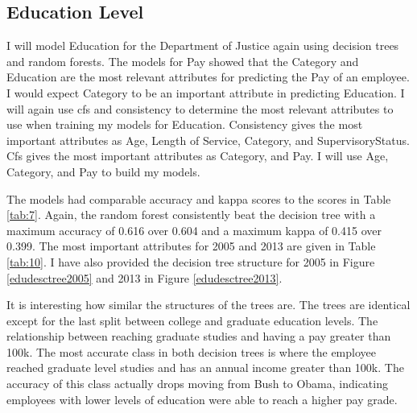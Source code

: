 \documentclass{article}
\begin{document}
    \subsection{Education Level}
    I will model Education for the Department of Justice again using decision trees and random forests. The models for Pay showed that the Category and Education are the most relevant attributes for predicting the Pay of an employee. I would expect Category to be an important attribute in predicting Education. I will again use cfs and consistency to determine the most relevant attributes to use when training my models for Education. Consistency gives the most important attributes as Age, Length of Service, Category, and SupervisoryStatus. Cfs gives the most important attributes as Category, and Pay. I will use Age, Category, and Pay to build my models.
    \par
    The models had comparable accuracy and kappa scores to the scores in Table \ref{tab:7}. Again, the random forest consistently beat the decision tree with a maximum accuracy of 0.616 over 0.604 and a maximum kappa of 0.415 over 0.399. The most important attributes for 2005 and 2013 are given in Table \ref{tab:10}. I have also provided the decision tree structure for 2005 in Figure \ref{edudesctree2005} and 2013 in Figure \ref{edudesctree2013}.
    \par
    It is interesting how similar the structures of the trees are. The trees are identical except for the last split between college and graduate education levels. The relationship between reaching graduate studies and having a pay greater than 100k. The most accurate class in both decision trees is where the employee reached graduate level studies and has an annual income greater than 100k. The accuracy of this class actually drops moving from Bush to Obama, indicating employees with lower levels of education were able to reach a higher pay grade.
\end{document}
